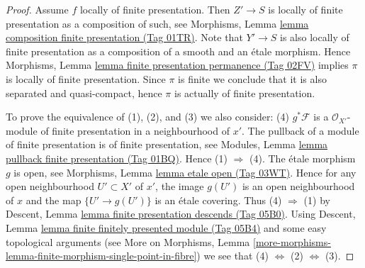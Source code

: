 \documentclass{amsart}
\theoremstyle{plain}
\theoremstyle{definition}
\theoremstyle{remark}
\numberwithin{equation}{subsection}
\begin{document}
\begin{proof}
Assume $f$ locally of finite presentation. Then $Z' \to S$ is locally
of finite presentation as a composition of such, see
Morphisms, Lemma \href{https://stacks.math.columbia.edu/tag/01TR}{lemma composition finite presentation (Tag 01TR)}.
Note that $Y' \to S$ is also locally of finite presentation as a composition
of a smooth and an \'etale morphism. Hence
Morphisms, Lemma \href{https://stacks.math.columbia.edu/tag/02FV}{lemma finite presentation permanence (Tag 02FV)}
implies $\pi$ is locally of finite presentation.
Since $\pi$ is finite we conclude that it is also separated and
quasi-compact, hence $\pi$ is actually of finite presentation.

\medskip\noindent
To prove the equivalence of (1), (2), and (3) we also consider:
(4) $g^*\mathcal{F}$ is a $\mathcal{O}_{X'}$-module of finite presentation
in a neighbourhood of $x'$. The pullback of a module of finite presentation
is of finite presentation, see
Modules, Lemma \href{https://stacks.math.columbia.edu/tag/01BQ}{lemma pullback finite presentation (Tag 01BQ)}.
Hence (1) $\Rightarrow$ (4).
The \'etale morphism $g$ is open, see
Morphisms, Lemma \href{https://stacks.math.columbia.edu/tag/03WT}{lemma etale open (Tag 03WT)}.
Hence for any open neighbourhood $U' \subset X'$ of $x'$, the image
$g(U')$ is an open neighbourhood of $x$ and the map
$\{U' \to g(U')\}$ is an \'etale covering. Thus (4) $\Rightarrow$ (1) by
Descent, Lemma \href{https://stacks.math.columbia.edu/tag/05B0}{lemma finite presentation descends (Tag 05B0)}.
Using
Descent, Lemma \href{https://stacks.math.columbia.edu/tag/05B4}{lemma finite finitely presented module (Tag 05B4)}
and some easy topological arguments (see
More on Morphisms,
Lemma \ref{more-morphisms-lemma-finite-morphism-single-point-in-fibre})
we see that
(4) $\Leftrightarrow$ (2) $\Leftrightarrow$ (3).


\end{proof}
\end{document}
